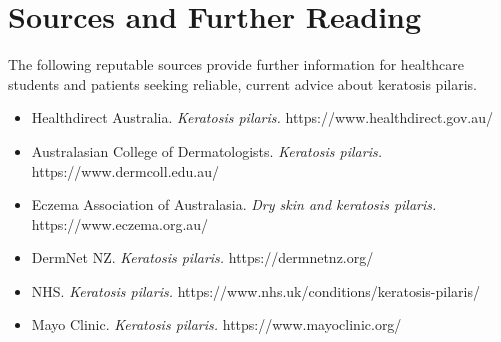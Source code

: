 \section*{Sources and Further Reading}
The following reputable sources provide further information for healthcare students and patients seeking reliable, current advice about keratosis pilaris.
\begin{itemize}
    \item Healthdirect Australia. \textit{Keratosis pilaris.} https://www.healthdirect.gov.au/
    \item Australasian College of Dermatologists. \textit{Keratosis pilaris.} https://www.dermcoll.edu.au/
    \item Eczema Association of Australasia. \textit{Dry skin and keratosis pilaris.} https://www.eczema.org.au/
    \item DermNet NZ. \textit{Keratosis pilaris.} https://dermnetnz.org/
    \item NHS. \textit{Keratosis pilaris.} https://www.nhs.uk/conditions/keratosis-pilaris/
    \item Mayo Clinic. \textit{Keratosis pilaris.} https://www.mayoclinic.org/
\end{itemize}
